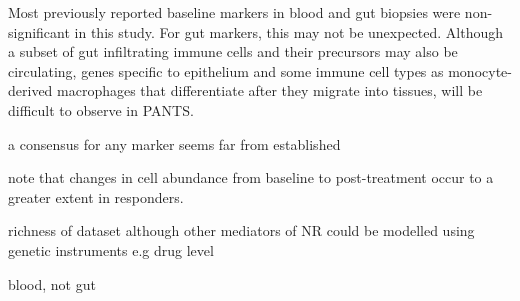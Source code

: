 \begin{outline}
Most previously reported baseline markers in blood and gut biopsies were non-significant in this study.
For gut markers, this may not be unexpected.
Although a subset of gut infiltrating immune cells and their precursors may also be circulating,
genes specific to epithelium and some immune cell types as monocyte-derived macrophages that differentiate after they migrate into tissues,
will be difficult to observe in \gls{PANTS}.


a consensus for any marker seems far from established

    \textcite{gaujoux2019CellcentredMetaanalysisReveals} note that changes in cell abundance from baseline to post-treatment occur to a greater extent in responders. 


        richness of dataset 
        although
        other mediators of NR could be modelled using genetic instruments e.g drug level

    \2 blood, not gut


\end{outline}
